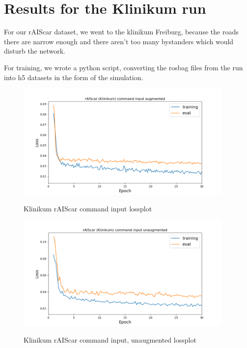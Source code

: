 \documentclass[a4paper]{article}
\begin{document}
\newpage{}
\section{Results for the Klinikum run}
For our rAIScar dataset, we went to the klinikum Freiburg, because the roads
there are narrow enough and there aren't too many bystanders which would disturb
the network.

For training, we wrote a python script, converting the rosbag files from the run
into h5 datasets in the form of the simulation.
\begin{figure}[!htbp]
  \centering
  \includegraphics[width=0.95\textwidth]{figures/klinikum_command_input_aug_lossplot}
  \label{fig:klinikum_augmented_command_loss}
  \caption{Klinikum rAIScar command input lossplot}
\end{figure}
\begin{figure}[!htbp]
  \centering
  \includegraphics[width=0.95\textwidth]{figures/klinikum_command_input_nonaug_lossplot}
  \label{fig:klinikum_unaugmented_command_loss}
  \caption{Klinikum rAIScar command input, unaugmented lossplot}
\end{figure}
\end{document}
